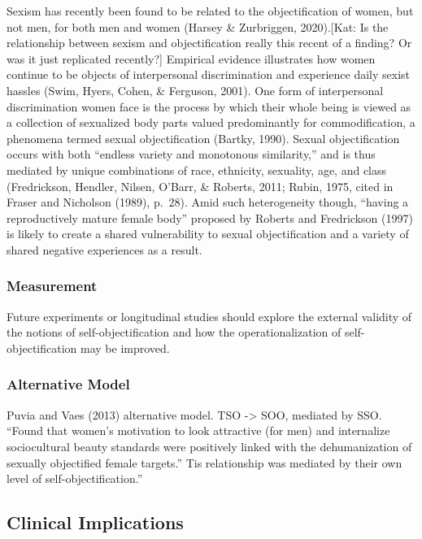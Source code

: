 \documentclass[man]{apa6}
\begin{document}
Sexism has recently been found to be related to the objectification of
women, but not men, for both men and women (Harsey \& Zurbriggen,
2020).{[}Kat: Is the relationship between sexism and objectification
really this recent of a finding? Or was it just replicated recently?{]}
Empirical evidence illustrates how women continue to be objects of
interpersonal discrimination and experience daily sexist hassles (Swim,
Hyers, Cohen, \& Ferguson, 2001). One form of interpersonal
discrimination women face is the process by which their whole being is
viewed as a collection of sexualized body parts valued predominantly for
commodification, a phenomena termed sexual objectification (Bartky,
1990). Sexual objectification occurs with both \enquote{endless variety
and monotonous similarity,} and is thus mediated by unique combinations
of race, ethnicity, sexuality, age, and class (Fredrickson, Hendler,
Nilsen, O'Barr, \& Roberts, 2011; Rubin, 1975, cited in Fraser and
Nicholson (1989), p.~28). Amid such heterogeneity though,
\enquote{having a reproductively mature female body} proposed by Roberts
and Fredrickson (1997) is likely to create a shared vulnerability to
sexual objectification and a variety of shared negative experiences as a
result.

\subsubsection{Measurement}\label{measurement}

Future experiments or longitudinal studies should explore the external
validity of the notions of self-objectification and how the
operationalization of self-objectification may be improved.

\subsubsection{Alternative Model}\label{alternative-model}

Puvia and Vaes (2013) alternative model. TSO -\textgreater{} SOO,
mediated by SSO. \enquote{Found that women's motivation to look
attractive (for men) and internalize sociocultural beauty standards were
positively linked with the dehumanization of sexually objectified female
targets.} Tis relationship was mediated by their own level of
self-objectification.''

\subsection{Clinical Implications}\label{clinical-implications}
\end{document}
